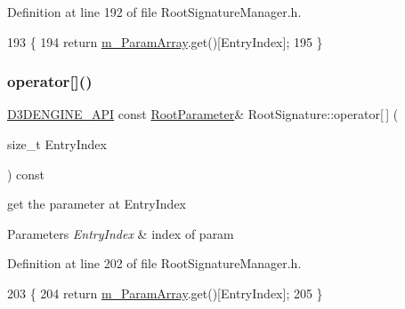 Definition at line 192 of file Root\+Signature\+Manager.\+h.


\begin{DoxyCode}
193     \{
194         \textcolor{keywordflow}{return} \mbox{\hyperlink{class_root_signature_a4b0c1a56f8fe468fc8ca30dccf490eaa}{m\_ParamArray}}.get()[EntryIndex];
195     \}
\end{DoxyCode}
\mbox{\label{class_root_signature_a699105d59c405303de3ccfa03e7c4ff3}} 
\subsubsection{\texorpdfstring{operator[]()}{operator[]()}\hspace{0.1cm}{\footnotesize\ttfamily [2/2]}}
{\footnotesize\ttfamily \mbox{\hyperlink{stdafx_8h_a8ee2d990c5dfba7794dd2b60741d7722}{D3\+D\+E\+N\+G\+I\+N\+E\+\_\+\+A\+PI}} const \mbox{\hyperlink{class_root_parameter}{Root\+Parameter}}\& Root\+Signature\+::operator\mbox{[}$\,$\mbox{]} (\begin{DoxyParamCaption}\item[{size\+\_\+t}]{Entry\+Index }\end{DoxyParamCaption}) const\hspace{0.3cm}{\ttfamily [inline]}}



get the parameter at Entry\+Index 


\begin{DoxyParams}{Parameters}
{\em Entry\+Index} & index of param \\
\hline
\end{DoxyParams}


Definition at line 202 of file Root\+Signature\+Manager.\+h.


\begin{DoxyCode}
203     \{
204         \textcolor{keywordflow}{return} \mbox{\hyperlink{class_root_signature_a4b0c1a56f8fe468fc8ca30dccf490eaa}{m\_ParamArray}}.get()[EntryIndex];
205     \}
\end{DoxyCode}
\mbox{\label{class_root_signature_adf2d07ea00480100b1504fa9f759712b}} 
